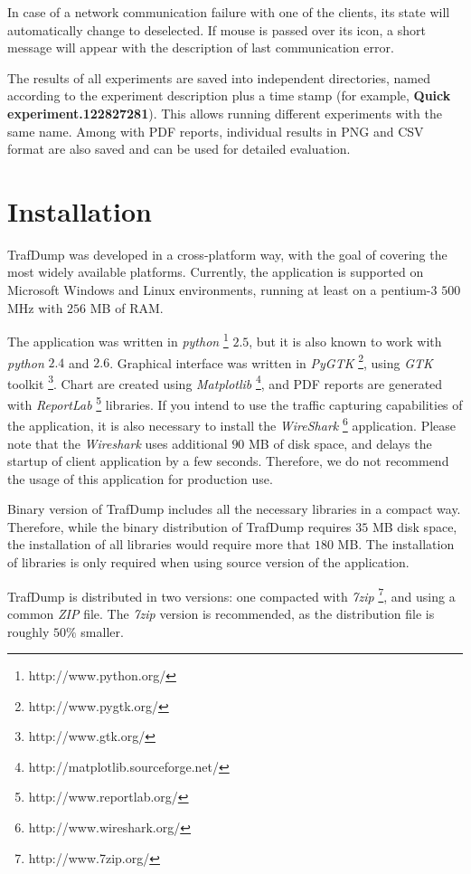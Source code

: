 \documentclass[12pt]{report}
\begin{document}
In case of a network communication failure with one of the clients, its
state will automatically change to deselected. If mouse is passed over its
icon, a short message will appear with the description of last communication error.

The results of all experiments are saved into independent directories, named
according to the experiment description plus a time stamp (for example,
\textbf{Quick experiment.122827281}). This allows running different
experiments with the same name. Among with PDF reports, individual results
in PNG and CSV format are also saved and can be used for detailed
evaluation.

\chapter{Installation}

TrafDump was developed in a cross-platform way, with the goal of covering
the most widely available platforms. Currently, the application is supported
on Microsoft Windows and Linux environments, running at least on a pentium-3
$500$ MHz with $256$ MB of RAM.

The application was written in \emph{python}
\footnote{http://www.python.org/} $2.5$, but it is also known to work with
\emph{python} $2.4$ and $2.6$. Graphical interface was written in
\emph{PyGTK} \footnote{http://www.pygtk.org/}, using \emph{GTK} toolkit
\footnote{http://www.gtk.org/}. Chart are created using \emph{Matplotlib}
\footnote{http://matplotlib.sourceforge.net/}, and PDF reports are generated
with \emph{ReportLab} \footnote{http://www.reportlab.org/} libraries. If you
intend to use the traffic capturing capabilities of the application, it is
also necessary to install the \emph{WireShark}
\footnote{http://www.wireshark.org/} application. Please note that the
\emph{Wireshark} uses additional $90$ MB of disk space, and delays the
startup of client application by a few seconds. Therefore, we do not
recommend the usage of this application for production use.

Binary version of TrafDump includes all the necessary libraries in a compact
way. Therefore, while the binary distribution of TrafDump requires $35$ MB
disk space, the installation of all libraries would require more that $180$
MB. The installation of libraries is only required when using source version
of the application.

TrafDump is distributed in two versions: one compacted with \emph{7zip}
\footnote{http://www.7zip.org/}, and using a common \emph{ZIP} file. The
\emph{7zip} version is recommended, as the distribution file is roughly
$50\%$ smaller.
\end{document}
